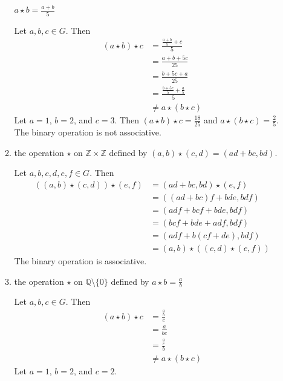 \begin{enumerate}
\begin{enumerate}[label = (\alph*)]
    \(a\star b = \frac{a + b}{5}\)
    \par\smallskip
    Let \(a, b, c\in G\).
    Then
    \begin{align*}
      (a\star b)\star c & = \frac{\frac{a + b}{5} + c}{5}\\
                        & = \frac{a + b + 5c}{25}\\
                        & = \frac{b + 5c + a}{25}\\
                        & = \frac{\frac{b + 5c}{5} + \frac{a}{5}}{5}\\
                        & \neq a\star (b\star c)
    \end{align*}
    Let \(a = 1\), \(b = 2\), and \(c = 3\).
    Then \((a\star b)\star c = \frac{18}{25}\) and
    \(a\star (b\star c) = \frac{2}{5}\).
    The binary operation is not associative.
  \item
    the operation \(\star\) on \(\mathbb{Z}\times\mathbb{Z}\) defined by
    \((a, b)\star (c, d) = (ad + bc, bd)\).
    \par\smallskip
    Let \(a, b, c, d, e, f \in G\).
    Then
    \begin{align*}
      ((a, b)\star (c, d))\star (e, f) & = (ad + bc, bd)\star (e, f)\\
                                       & = ((ad + bc)f + bde, bdf)\\
                                       & = (adf + bcf + bde, bdf)\\
                                       & = (bcf + bde + adf, bdf)\\
                                       & = (adf + b(cf + de), bdf)\\
                                       & = (a, b)\star ((c, d)\star (e, f))
    \end{align*}
    The binary operation is associative.
  \item
    the operation \(\star\) on \(\mathbb{Q}\setminus\{0\}\) defined by
    \(a\star b = \frac{a}{b}\)
    \par\smallskip
    Let \(a, b, c\in G\).
    Then
    \begin{align*}
      (a\star b)\star c & = \frac{\frac{a}{b}}{c}\\
                        & = \frac{a}{bc}\\
                        & = \frac{\frac{a}{c}}{b}\\
                        & \neq a\star (b\star c)
    \end{align*}
    Let \(a = 1\), \(b = 2\), and \(c = 2\).

\end{enumerate}
\end{enumerate}

